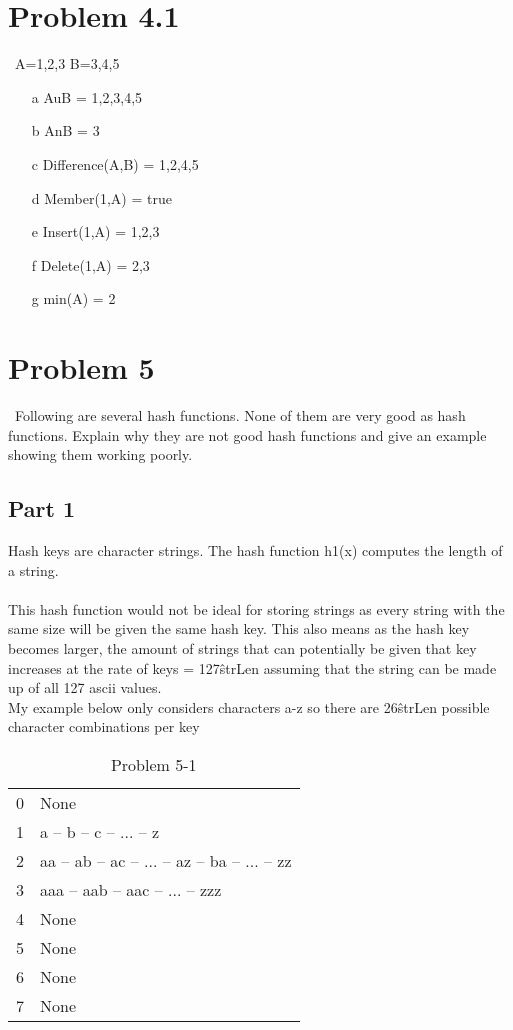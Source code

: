 \documentclass{article}
\begin{document}
		
		\section*{Problem 4.1}
		\ A={1,2,3} B={3,4,5}\\
		\begin{enumerate}
			\item[a] AuB = {1,2,3,4,5}
			\item[b] AnB = {3} 
			\item[c] Difference(A,B) = {1,2,4,5}
			\item[d] Member(1,A) = true
			\item[e] Insert(1,A) = {1,2,3}
			\item[f] Delete(1,A) = {2,3}
			\item[g] min(A) = {2}
		\end{enumerate}
		
		\section*{Problem 5}
		\ Following are several hash functions. None of them are very good as hash functions. Explain why they are not good hash functions and give an example showing them working poorly.\\
		\subsection{Part 1}
		Hash keys are character strings. The hash function h1(x) computes the length of a string.\\\\
		This hash function would not be ideal for storing strings as every string with the same size will be given the same hash key. This also means as the hash key becomes larger, the amount of strings that can potentially be given that key increases at the rate of keys = 127\^strLen assuming that the string can be made up of all 127 ascii values. \\ My example below only considers characters a-z so there are 26\^strLen possible character combinations per key
\\		 
		 
		\begin{table}[H]
			\centering
			\caption{Problem 5-1}
			\begin{tabular}{ll}
				0& None\\
				1& a -- b -- c -- ... -- z\\
				2& aa -- ab -- ac -- ... -- az -- ba -- ... -- zz \\
				3& aaa -- aab -- aac -- ... -- zzz\\
				4& None\\
				5& None\\
				6& None\\
				7& None\\
			\end{tabular}
		\end{table}
		
\end{document}
